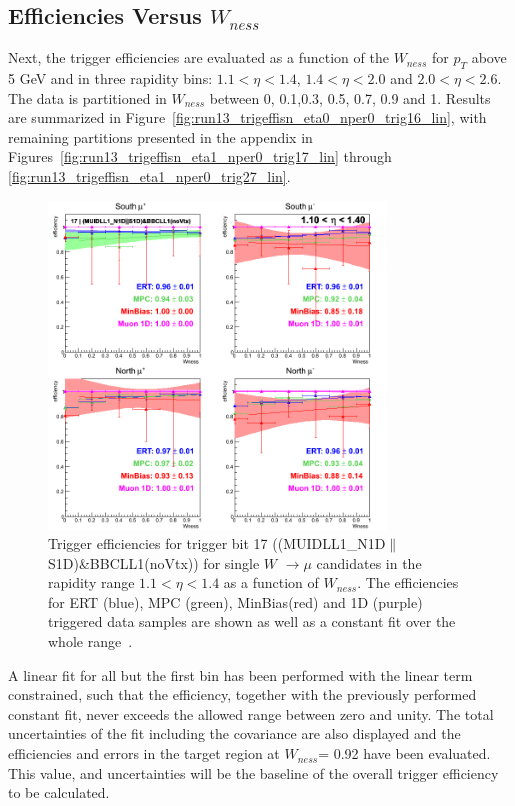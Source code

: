 \clearpage
\subsection{Efficiencies Versus $W_{ness}$}

Next, the trigger efficiencies are evaluated as a function of the $W_{ness}$ for
$p_T$ above 5 GeV and in three rapidity bins: $1.1 < \eta < 1.4$, $1.4 < \eta <
2.0$ and $2.0 < \eta < 2.6$. The data is partitioned in $W_{ness}$ between 0,
0.1,0.3, 0.5, 0.7, 0.9 and 1. Results are summarized in
Figure~\ref{fig:run13_trigeffisn_eta0_nper0_trig16_lin}, with remaining
partitions presented in the appendix in
Figures~\ref{fig:run13_trigeffisn_eta1_nper0_trig17_lin} through
\ref{fig:run13_trigeffisn_eta1_nper0_trig27_lin}.

\begin{figure}[ht]
  \centering
  \includegraphics[width=0.8\textwidth]{./figures/run13_trigeffisn_eta0_trig17_lin.png}
  \caption{
    Trigger efficiencies for trigger bit 17
    ((MUIDLL1\_N1D$\|$S1D)\&BBCLL1(noVtx)) for single $W$ $\rightarrow \mu$
    candidates in the rapidity range $ 1.1 < \eta < 1.4$ as a function of
    $W_{ness}$. The efficiencies for ERT (blue), MPC (green), MinBias(red) and
    1D (purple) triggered data samples are shown as well as a constant fit over
    the whole range~\cite{Seidl2014}.
  }
  \label{fig:run13_trigeffisn_eta0_nper0_trig17_lin} 
\end{figure}

A linear fit for all but the first bin has been performed with the linear term
constrained, such that the efficiency, together with the previously performed
constant fit, never exceeds the allowed range between zero and unity. The total
uncertainties of the fit including the covariance are also displayed and the
efficiencies and errors in the target region at $W_{ness}$= 0.92 have been
evaluated.  This value, and uncertainties will be the baseline of the overall
trigger efficiency to be calculated.

